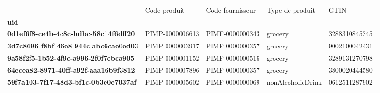 \begin{tabularx}{\linewidth}{lXXXX}
\toprule
{} &     Code produit & Code fournisseur &    Type de produit &           GTIN \\
\textbf{uid                                 } &                  &                  &                    &                \\
\midrule
\textbf{0d1ef6f8-ce4b-4c8c-bdbc-58c14f6dff20} &  PIMP-0000006613 &  PIMF-0000000343 &            grocery &  3288310845345 \\
\textbf{3d7c8696-f8bf-46e8-944c-abc6cae0ed03} &  PIMP-0000003917 &  PIMF-0000000357 &            grocery &  9002100042431 \\
\textbf{9a58f2f5-1b52-4f9c-a996-2f0f7cbca905} &  PIMP-0000001152 &  PIMF-0000000516 &            grocery &  3289131270798 \\
\textbf{64ecea82-8971-40ff-a92f-aaa16b9f3812} &  PIMP-0000007896 &  PIMF-0000000357 &            grocery &  3800020444580 \\
\textbf{59f7a103-7f17-48d3-bf1c-0b3e0e7037af} &  PIMP-0000005602 &  PIMF-0000000069 &  nonAlcoholicDrink &  0612511287902 \\
\bottomrule
\end{tabularx}
